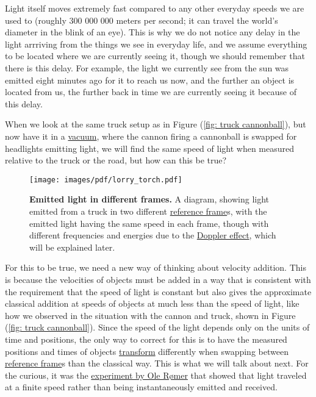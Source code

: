Light itself moves extremely fast compared to any other everyday speeds we are used to (roughly 300 000 000 meters per second; it can travel the world's diameter in the blink of an eye).
This is why we do not notice any delay in the light arrriving from the things we see in everyday life, and we assume everything to be located where we are currently seeing it, though we should remember that there is this delay.
For example, the light we currently see from the sun was emitted eight minutes ago for it to reach us now, and the further an object is located from us, the further back in time we are currently seeing it because of this delay.

When we look at the same truck setup as in Figure (\ref{fig: truck cannonball}), but now have it in a \hyperlink{def-vacuum}{vacuum}, where the cannon firing a cannonball is swapped for headlights emitting light, we will find the same speed of light when measured relative to the truck or the road, but how can this be true?

\begin{figure}[H]
	\centering
	\texttt{[image: images/pdf/lorry\_torch.pdf]}
	\caption{\textbf{Emitted light in different frames.} A diagram, showing light emitted from a truck in two different \protect\hyperlink{def-Reference-frame}{reference frame}s, with the emitted light having the same speed in each frame, though with different frequencies and energies due to the \protect\hyperlink{def-doppler-effect}{Doppler effect}, which will be explained later.}
	\label{fig: truck torch}
\end{figure}

For this to be true, we need a new way of thinking about velocity addition.
This is because the velocities of objects must be added in a way that is consistent with the requirement that the speed of light is constant but also gives the approximate classical addition at speeds of objects at much less than the speed of light, like how we observed in the situation with the cannon and truck, shown in Figure (\ref{fig: truck cannonball}).
Since the speed of the light depends only on the units of time and positions, the only way to correct for this is to have the measured positions and times of objects \hyperlink{def-transform}{transform} differently when swapping between \hyperlink{def-Reference-frame}{reference frame}s than the classical way.
This is what we will talk about next.
For the curious, it was the \href{https://scienceready.com.au/pages/determination-of-speed-of-light}{experiment by Ole Rømer} that showed that light traveled at a finite speed rather than being instantaneously emitted and received.

